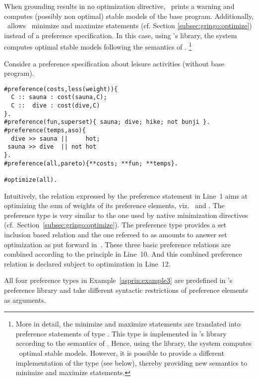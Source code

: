 When grounding results in no optimization directive, 
\asprin\ prints a warning and computes (possibly non optimal) stable models of the base program.
%
Additionally, \asprin\ allows \clingo\ minimize and maximize statements 
(cf. Section \ref{subsec:gringo:optimize}) instead of a preference specification.
%
In this case, using \asprin's library, the system computes optimal stable models
following the semantics of \clingo.%
\footnote{%
More in detail, the minimize and maximize statements 
are translated into preference statements of type .
%
This type is implemented in \asprin's library according to the semantics of \clingo.
%
Hence, using the library, the system computes \clingo\ optimal stable models.
%
However, it is possible to provide a different implementation of the type  (see below), 
thereby providing new semantics to minimize and maximize statements.}

\begin{example}\label{asprin:example3}
Consider a preference specification about leisure activities (without base program).
\begin{lstlisting}[escapechar=?]
#preference(costs,less(weight)){ 
  C :: sauna : cost(sauna,C); 
  C ::  dive : cost(dive,C) 
}.
#preference(fun,superset){ sauna; dive; hike; not bunji }.
#preference(temps,aso){
  dive >> sauna ||     hot; 
 sauna >> dive  || not hot
}.
#preference(all,pareto){**costs; **fun; **temps}.

#optimize(all).
\end{lstlisting}
Intuitively, the relation expressed by the preference statement  in Line~1 aims at optimizing the sum of weights of its preference elements, 
viz.\  and .
The preference type  is very similar to the one used by native minimization directives (cf.\ Section~\ref{subsec:gringo:optimize}).
The preference type  provides a set inclusion based relation and the one refereed to as 
amounts to answer set optimization as put forward in~\cite{brnitr03a}.
These three basic preference relations are combined according to the  principle in Line~10.
And this combined preference relation is declared subject to optimization in Line~12.
\end{example}
%
\begin{note}
All four preference types in Example~\ref{asprin:example3} are predefined in \asprin's preference library and take different syntactic restrictions of preference elements as arguments.  
\end{note}


